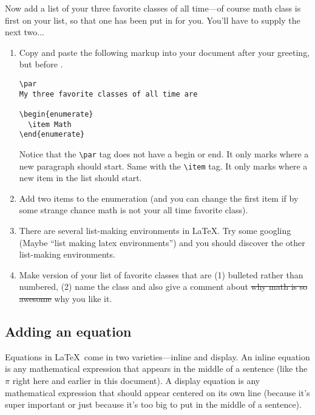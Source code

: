 Now add a list of your three favorite classes of all time---of course
math class is first on your list, so that one has been put in for
you. You'll have to supply the next two...

\begin{enumerate}

\item Copy and paste the following markup into your document 
after your greeting, but before \verb++.
\bigskip

\begin{codeblock}
\begin{verbatim}
\par
My three favorite classes of all time are

\begin{enumerate}
  \item Math
\end{enumerate}
\end{verbatim}
\end{codeblock}
\bigskip

Notice that the \verb+\par+ tag does not have a begin
or end. It only marks where a new paragraph should start. Same with
the \verb+\item+ tag. It only marks where a new item
in the list should start.
\item Add two items to the enumeration (and you can change the first item
if by some strange chance math is not your all time favorite class).
\item There are several list-making environments in \LaTeX.  Try some googling (Maybe ``list making latex environments'') 
and you should discover the other list-making environments.
\item Make version of your list of favorite classes that are (1) bulleted rather than numbered, (2) name the class and also give a comment about \sout{why math is so awesome} why you like it.

\end{enumerate}

\subsection*{Adding an equation}

Equations in \LaTeX\ come in two varieties---inline and display.
An inline equation is any mathematical expression that appears in
the middle of a sentence (like the $\pi$ right here and earlier in
this document). A display equation is any mathematical expression
that should appear centered on its own line (because it's super important
or just because it's too big to put in the middle of a sentence).

